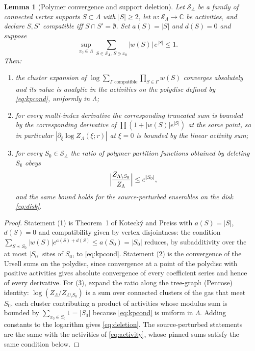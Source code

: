 \documentclass[11pt]{article}
\theoremstyle{plain}
\newtheorem{lemma}{Lemma}
\theoremstyle{definition}
\begin{document}
\begin{lemma}[Polymer convergence and support deletion]\label{lem:kp}
Let $\mathcal S_\Lambda$ be a family of connected vertex supports $S\subset\Lambda$ with
$|S|\ge2$, let $w:\mathcal S_\Lambda\to\mathbb C$ be activities, and declare
$S,S'$ compatible iff $S\cap S'=\emptyset$. Set $a(S)=|S|$ and $d(S)=0$ and suppose
\begin{equation}\label{eq:kpcond}
 \sup_{x_0\in\Lambda}\sum_{S\in\mathcal S_\Lambda,\,S\ni x_0}|w(S)|\,e^{|S|}\le1 .
\end{equation}
Then:
\begin{enumerate}
\item the cluster expansion of $\log\sum_{\Gamma\text{ compatible}}\prod_{S\in\Gamma}w(S)$
converges absolutely and its value is analytic in the activities on the polydisc
defined by \eqref{eq:kpcond}, uniformly in $\Lambda$;
\item for every multi-index derivative the corresponding truncated sum is bounded by
the corresponding derivative of $\prod(1+|w(S)|e^{|S|})$ at the same point, so in
particular $|\partial_\xi\log Z_\Lambda(\xi;r)|$ at $\xi=0$ is bounded by the
linear activity sum;
\item for every $S_0\in\mathcal S_\Lambda$ the ratio of polymer partition functions
obtained by deleting $S_0$ obeys
\begin{equation}\label{eq:deletion}
 \Bigl|\frac{Z_{\Lambda\setminus S_0}}{Z_\Lambda}\Bigr|\le e^{|S_0|},
\end{equation}
and the same bound holds for the source-perturbed ensembles on the disk
\eqref{eq:disk}.
\end{enumerate}
\end{lemma}

\begin{proof}
Statement (1) is Theorem~1 of Koteck\'y and Preiss \cite{kp} with
$a(S)=|S|$, $d(S)=0$ and compatibility given by vertex disjointness: the condition
$\sum_{S\not\sim S_0}|w(S)|e^{a(S)+d(S)}\le a(S_0)=|S_0|$ reduces, by subadditivity
over the at most $|S_0|$ sites of $S_0$, to \eqref{eq:kpcond}. Statement (2) is the
convergence of the Ursell sums on the polydisc, since convergence at a point of the
polydisc with positive activities gives absolute convergence of every coefficient
series and hence of every derivative. For (3), expand the ratio along the tree-graph
(Penrose) identity: $\log(Z_{\Lambda}/Z_{\Lambda\setminus S_0})$ is a sum over
connected clusters of the gas that meet $S_0$, each cluster contributing a product of
activities whose modulus sum is bounded by $\sum_{x_0\in S_0}1=|S_0|$ because
\eqref{eq:kpcond} is uniform in $\Lambda$. Adding constants to the logarithm gives
\eqref{eq:deletion}. The source-perturbed statements are the same with the activities
of \eqref{eq:activity}, whose pinned sums satisfy the same condition below.
\end{proof}
\end{document}
